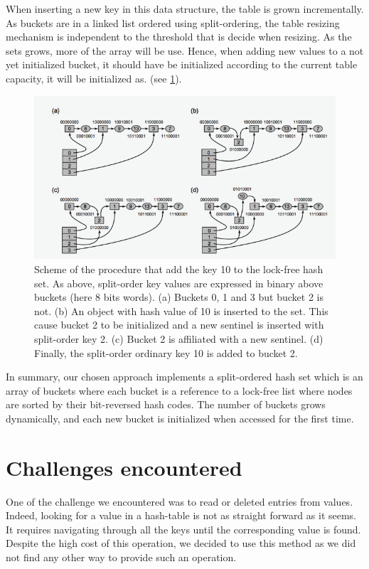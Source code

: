 \documentclass[a4paper,11pt]{report}
\begin{document}
    When inserting a new key in this data structure, the table is grown incrementally.
    As buckets are in a linked list ordered using split-ordering, the table resizing mechanism is independent to
    the threshold that is decide when resizing. As the sets grows, more of the array will be use. Hence, when adding
    new values to a not yet initialized bucket, it should have be initialized according to the current table capacity,
    it will be initialized as. (see \ref{fig:Fig2}).


    \begin{figure}[h]
        \centering
            \includegraphics{images/hashsetFig2.png}
        \caption{Scheme of the procedure that add the key 10 to the lock-free hash set.
        As above, split-order key values are expressed in binary above buckets (here 8 bits words).
        (a) Buckets 0, 1 and 3 but bucket 2 is not.
        (b) An object with hash value of 10 is inserted to the set. This cause bucket 2 to be initialized and a new sentinel is inserted with split-order key 2.
        (c) Bucket 2 is affiliated with a new sentinel.
        (d) Finally, the split-order ordinary key 10 is added to bucket 2.}
        \label{fig:Fig2}
    \end{figure}

    In summary, our chosen approach implements a split-ordered hash set which is an array of buckets where each bucket
    is a reference to a lock-free list where nodes are sorted by their bit-reversed hash codes.
    The number of buckets grows dynamically, and each new bucket is initialized when accessed for the first time.

    \section*{Challenges encountered}
    One of the challenge we encountered was to read or deleted entries from values.
    Indeed, looking for a value in a hash-table is not as straight forward as it seems.
    It requires navigating through all the keys until the corresponding value is found.
    Despite the high cost of this operation, we decided to use this method as we did not find any other way to provide
    such an operation.
\end{document}
